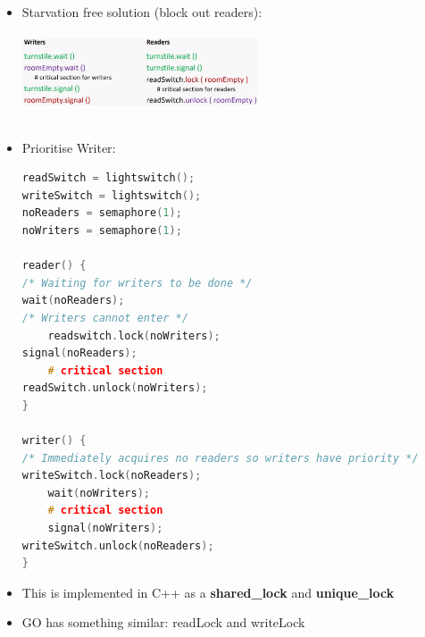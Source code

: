 \documentclass[10pt, landscape]{article}
\begin{document}
\begin{multicols}{4}
\begin{itemize}
    \item Starvation free solution (block out readers): \\
    \includegraphics*[width = 7cm, height = 3cm]{turnstile.png} \\
    \item Prioritise Writer: \\
\begin{lstlisting}[language=C++, breaklines=true, breakatwhitespace=true]
readSwitch = lightswitch();
writeSwitch = lightswitch();
noReaders = semaphore(1);
noWriters = semaphore(1);

reader() {
/* Waiting for writers to be done */ 
wait(noReaders);
/* Writers cannot enter */
    readswitch.lock(noWriters);
signal(noReaders);
    # critical section
readSwitch.unlock(noWriters);
}

writer() {
/* Immediately acquires no readers so writers have priority */
writeSwitch.lock(noReaders);
    wait(noWriters);
    # critical section
    signal(noWriters);
writeSwitch.unlock(noReaders);
}
\end{lstlisting}
\item This is implemented in C++ as a \textbf{shared\_lock} and \textbf{unique\_lock}
\item GO has something similar: readLock and writeLock
\end{itemize}


\end{multicols}
\end{document}
